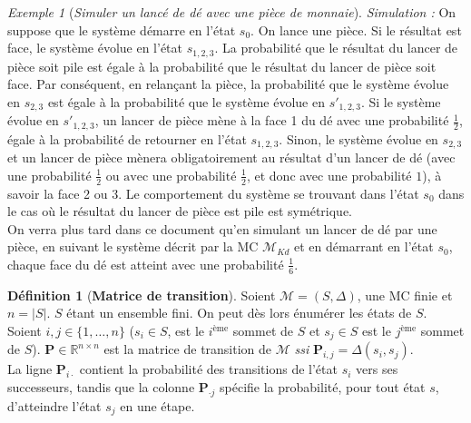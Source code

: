 \documentclass[12pt,a4paper]{report}
\theoremstyle{definition}
\newtheorem{definition}{Définition}[chapter]
\theoremstyle{remark}
\newtheorem{example}{Exemple}[chapter]
\newcommand{\ssi}{\textit{ssi} }
\begin{document}
\begin{example} [\textit{Simuler un lancé de dé avec une pièce de monnaie}]
	\textit{Simulation : }On suppose que le système démarre en l'état $s_0$. On lance une pièce. Si le résultat est face, le système évolue en l'état $s_{1, 2, 3}$. La probabilité que le résultat du lancer de pièce soit pile est égale à la probabilité que le résultat du lancer de pièce soit face. Par conséquent, en relançant la pièce, la probabilité que le système évolue en $s_{2, 3}$ est égale à la probabilité que le système évolue en $s'_{1, 2, 3}$. Si le système évolue en $s'_{1, 2, 3}$, un lancer de pièce mène à la face 1 du dé avec une probabilité $\frac{1}{2}$, égale à la probabilité de retourner en l'état $s_{1, 2, 3}$. Sinon, le système évolue en $s_{2, 3}$ et un lancer de pièce mènera obligatoirement au résultat d'un lancer de dé (avec une probabilité $\frac{1}{2} \text{ ou avec une probabilité }  \frac{1}{2}$, et donc avec une probabilité $1$), à savoir la face 2 ou 3. Le comportement du système se trouvant dans l'état $s_0$ dans le cas où le résultat du lancer de pièce est pile est symétrique.\\
	
	On verra plus tard dans ce document qu'en simulant un lancer de dé par une pièce, en suivant le système décrit par la MC $\mathcal{M}_{Kd}$ et en démarrant en l'état $s_0$, chaque face du dé est atteint avec une probabilité $\frac{1}{6}$.
\end{example}

\begin{definition}[\textbf{Matrice de transition}]
	Soient $\mathcal{M} = (S, \Delta)$, une MC finie et $n = |S|$. $S$ étant un ensemble fini. On peut dès lors énumérer les états de $S$. Soient $i,j \in \{1, \dots, n\}$ ($s_i \in S$, est le $i^{\text{ème}}$ sommet de $S$ et $s_j \in S$ est le $j^{\text{ème}}$ sommet de $S$).
	\textbf{P}$\in \mathbb{R}^{n \times n}$ est la matrice de transition de $\mathcal{M}$ \ssi $\textbf{P}_{i,j} = \Delta(s_i, s_j)$.\\
	La ligne $\textbf{P}_{i \cdot}$ contient la probabilité des transitions de l'état $s_i$ vers ses successeurs, tandis que la colonne $\textbf{P}_{\cdot j}$ spécifie la probabilité, pour tout état $s$, d'atteindre l'état $s_j$ en une étape.
\end{definition}
\end{document}

